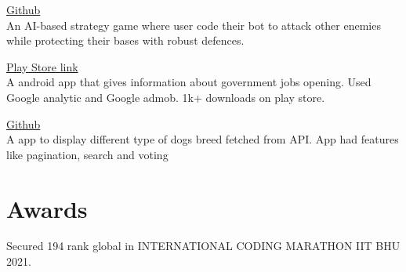 \documentclass[]{deedy-resume-openfont}
\begin{document}
\begin{minipage}[t]{0.69\textwidth}
\hfill \href{https://github.com/delta/codecharacter-web-2022}{Github}\\
An AI-based strategy game where user code their bot to attack other enemies while protecting their bases with robust defences.\\
\sectionsep

\hfill \href{https://play.google.com/store/apps/details?id=com.amostrone.akash.sanjeevwebsolutions}{Play Store link}\\
A android app that gives information about government jobs opening. Used Google analytic and Google admob. 1k+ downloads on play store.\\
\sectionsep

\hfill \href{https://github.com/jaiakash/Pawsome}{Github}\\
A app to display different type of dogs breed fetched from API. App had features like pagination, search and voting\\
\sectionsep


%
%
\section{Awards}
 
Secured 194 rank global in INTERNATIONAL CODING MARATHON IIT BHU 2021.\\
 

 

 

 

\sectionsep
\end{minipage} 
\ 
\end{document}
